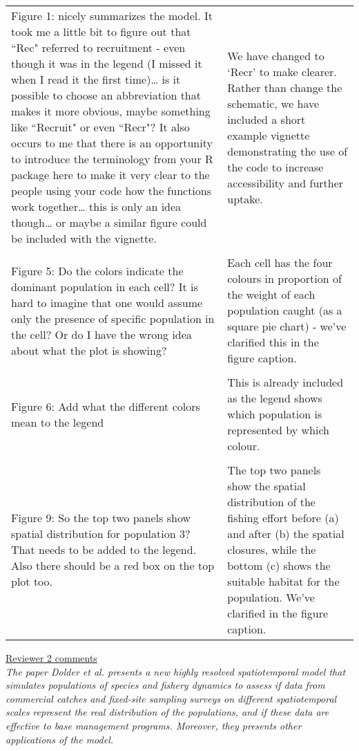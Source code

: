 \documentclass[10pt]{letter}
\begin{document}
\begin{center}
\begin{longtable}{p{8cm} | p{8cm}}
\\
Figure 1: nicely summarizes the model. It took me a little bit to figure out
that ``Rec" referred to recruitment - even though it was in the legend (I
missed it when I read it the first time)… is it possible to choose an
abbreviation that makes it more obvious, maybe something like ``Recruit" or
even ``Recr"? It also occurs to me that there is an opportunity to introduce
the terminology from your R package here to make it very clear to the people
using your code how the functions work together… this is only an idea though…
or maybe a similar figure could be included with the vignette. & We have
changed to `Recr' to make clearer. Rather than change the schematic, we have
included a short example vignette demonstrating the use of the code to increase
accessibility and further uptake. \\
\\
Figure 5: Do the colors indicate the dominant population in each cell? It is
hard to imagine that one would assume only the presence of specific population
in the cell? Or do I have the wrong idea about what the plot is showing? & Each
cell has the four colours in proportion of the weight of each population caught
(as a square pie chart) - we've clarified this in the figure caption. \\
\\
Figure 6: Add what the different colors mean to the legend & This is already
included as the legend shows which population is represented by which colour. \\
\\
Figure 9: So the top two panels show spatial distribution for population 3?
That needs to be added to the legend. Also there should be a red box on the top
plot too. & The top two panels show the spatial distribution of the fishing
effort before (a) and after (b) the spatial closures, while the bottom (c)
shows the suitable habitat for the population. We've clarified in the figure
caption. \\ 
\bottomrule
	\end{longtable}

\end{center}

\underline{Reviewer 2 comments} \\

\textit{The paper Dolder et al. presents a new highly resolved spatiotemporal
	model that simulates populations of species and fishery dynamics to
	assess if data from commercial catches and fixed-site sampling surveys
	on different spatiotemporal scales represent the real distribution of
	the populations, and if these data are effective to base  management
	programs. Moreover, they presents other applications of the model.} \\
\end{document}
